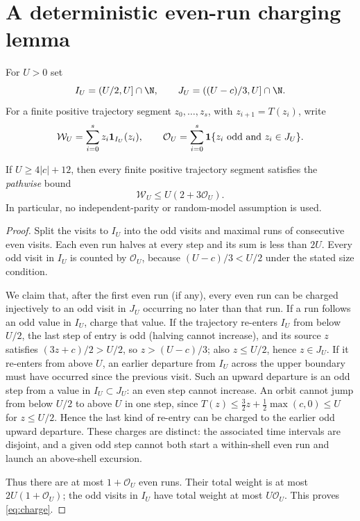 \section{A deterministic even-run charging lemma}
For $U>0$ set
\[
 I_U=(U/2,U]\cap\N,\qquad J_U=((U-c)/3,U]\cap\N.
\]
For a finite positive trajectory segment $z_0,\dots,z_s$, with
$z_{i+1}=T(z_i)$, write
\[
 \mathcal W_U=\sum_{i=0}^{s} z_i\mathbf1_{I_U}(z_i),\qquad
 \mathcal O_U=\sum_{i=0}^{s}\mathbf1\{z_i\text{ odd and }z_i\in J_U\}.
\]
\begin{lemma}\label{lem:charge}
If $U\ge 4|c|+12$, then every finite positive trajectory segment
satisfies the \emph{pathwise} bound
\begin{equation}\label{eq:charge}
 \boxed{\mathcal W_U\le U(2+3\mathcal O_U).}
\end{equation}
In particular, no independent-parity or random-model assumption is used.
\end{lemma}
\begin{proof}
Split the visits to $I_U$ into the odd visits and maximal runs
of consecutive even visits.  Each even run halves at every step and
its sum is less than $2U$.  Every odd visit in $I_U$ is counted by
$\mathcal O_U$, because $(U-c)/3<U/2$ under the stated size condition.

We claim that, after the first even run (if any), every even run can
be charged injectively to an odd visit in $J_U$ occurring no later
than that run.  If a run follows an odd value in $I_U$, charge that
value.  If the trajectory re-enters $I_U$ from below $U/2$, the last
step of entry is odd (halving cannot increase), and its source $z$
satisfies $(3z+c)/2>U/2$, so $z>(U-c)/3$; also $z\le U/2$, hence
$z\in J_U$.  If it re-enters from above $U$, an earlier departure
from $I_U$ across the upper boundary must have occurred since the
previous visit.  Such an upward departure is an odd step from a value
in $I_U\subset J_U$: an even step cannot increase.  An orbit cannot
jump from below $U/2$ to above $U$ in one step, since
$T(z)\le\frac32 z+\frac12\max(c,0)\le U$ for $z\le U/2$.
Hence the last kind of re-entry can be charged to the earlier odd
upward departure.  These charges are distinct: the associated time
intervals are disjoint, and a given odd step cannot both start a
within-shell even run and launch an above-shell excursion.

Thus there are at most $1+\mathcal O_U$ even runs.  Their total
weight is at most $2U(1+\mathcal O_U)$; the odd visits in $I_U$
have total weight at most $U\mathcal O_U$.  This proves
\eqref{eq:charge}.
\end{proof}

